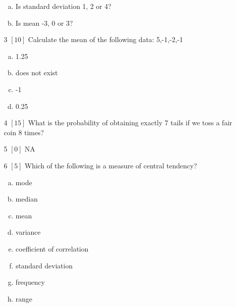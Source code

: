 \documentclass{article}
\begin{document}
\begin{itemize}
\begin{enumerate}[(a)]
\item Is standard deviation 1, 2 or 4? 
\vspace{\baselineskip}\item Is mean -3, 0 or 3? 
\vspace{\baselineskip}\end{enumerate}
\item[3] {\small $\left[10\right]$ }Calculate the mean of the following data:  
5,-1,-2,-1\begin{enumerate}[(a)]
\item 1.25  
\item does not exist 
\item -1  
\item  0.25  
\end{enumerate}
\item[4] {\small $\left[15\right]$ }
What is the probability of obtaining exactly 7 tails if we toss a fair coin 8 times?
\item[5] {\small $\left[0\right]$ }NA
\item[6] {\small $\left[5\right]$ }Which of the following is a measure of central tendency?
\begin{enumerate}[(a)]
\item mode 
\item median 
\item mean 
\item variance 
\item coefficient of correlation 
\item standard deviation 
\item frequency 
\item range 
\end{enumerate}
\end{itemize}
{\bf  }\newpage
\end{document}
